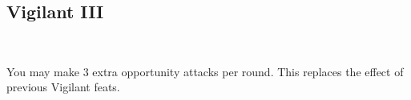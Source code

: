 \subsection*{Vigilant III}\label{feat:vigilant3}
 \\

You may make 3 extra opportunity attacks per round. This replaces the effect
of previous Vigilant feats.
